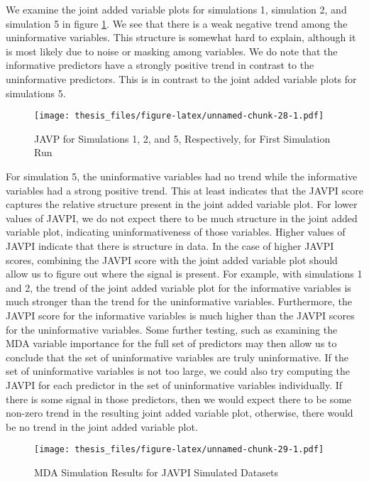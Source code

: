 \documentclass[12pt,twoside]{reedthesis}
\theoremstyle{definition}
\theoremstyle{definition}
\theoremstyle{definition}
\theoremstyle{remark}
\begin{document}
We examine the joint added variable plots for simulations 1, simulation
2, and simulation 5 in figure \ref{siml1to5plots}. We see that there is
a weak negative trend among the uninformative variables. This structure
is somewhat hard to explain, although it is most likely due to noise or
masking among variables. We do note that the informative predictors have
a strongly positive trend in contrast to the uninformative predictors.
This is in contrast to the joint added variable plots for simulations 5.
\par 
\begin{figure}
\centering
\texttt{[image: thesis\_files/figure-latex/unnamed-chunk-28-1.pdf]}
\caption{\label{fig:unnamed-chunk-28}\label{siml1to5plots}JAVP for
Simulations 1, 2, and 5, Respectively, for First Simulation Run}
\end{figure}
For simulation 5, the uninformative variables had no trend while the
informative variables had a strong positive trend. This at least
indicates that the JAVPI score captures the relative structure present
in the joint added variable plot. For lower values of JAVPI, we do not
expect there to be much structure in the joint added variable plot,
indicating uninformativeness of those variables. Higher values of JAVPI
indicate that there is structure in data. In the case of higher JAVPI
scores, combining the JAVPI score with the joint added variable plot
should allow us to figure out where the signal is present. For example,
with simulations 1 and 2, the trend of the joint added variable plot for
the informative variables is much stronger than the trend for the
uninformative variables. Furthermore, the JAVPI score for the
informative variables is much higher than the JAVPI scores for the
uninformative variables. Some further testing, such as examining the MDA
variable importance for the full set of predictors may then allow us to
conclude that the set of uninformative variables are truly
uninformative. If the set of uninformative variables is not too large,
we could also try computing the JAVPI for each predictor in the set of
uninformative variables individually. If there is some signal in those
predictors, then we would expect there to be some non-zero trend in the
resulting joint added variable plot, otherwise, there would be no trend
in the joint added variable plot. \par 
\begin{figure}
\centering
\texttt{[image: thesis\_files/figure-latex/unnamed-chunk-29-1.pdf]}
\caption{\label{fig:unnamed-chunk-29}\label{MDAforJAVPI} MDA Simulation
Results for JAVPI Simulated Datasets}
\end{figure}
\end{document}
